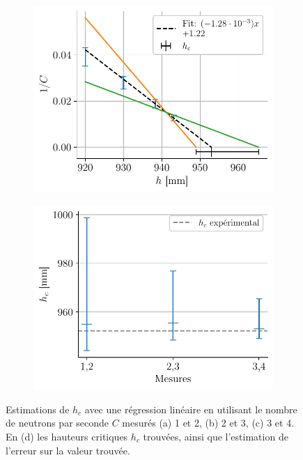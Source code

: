 \begin{figure}[H]
\begin{subfigure}{0.48\linewidth}
        \centering
        \includegraphics[width=\linewidth]{figures/h_C_pair34.pdf}
        \caption{}
        \label{fig:hc_C_34}
    \end{subfigure}
    \begin{subfigure}{0.48\linewidth}
        \centering
        \includegraphics[width=\linewidth]{figures/hc_results_C.pdf}
        \caption{}
        \label{fig:hc_C}
    \end{subfigure}
    \caption{Estimations de \(h_c\) avec une régression linéaire en utilisant le nombre de neutrons par seconde $C$ mesurés (a) 1 et 2, (b) 2 et 3, (c) 3 et 4. En (d) les hauteurs critiques \(h_c\) trouvées, ainsi que l'estimation de l'erreur sur la valeur trouvée.}
    \label{fig:hc_compte}
\end{figure}